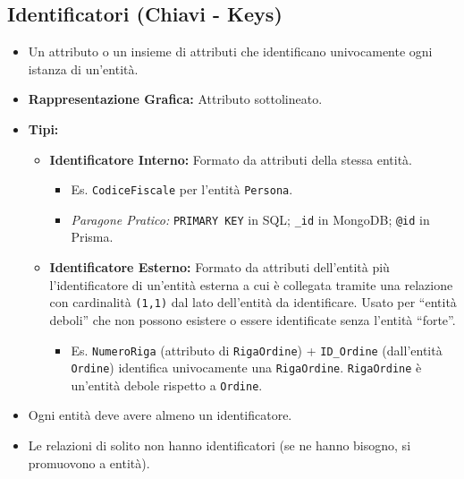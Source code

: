 \documentclass{article}
\begin{document}
	\subsection{Identificatori (Chiavi - Keys)}
	\begin{itemize}
		\item Un attributo o un insieme di attributi che identificano univocamente ogni istanza di un'entità.
		\item \textbf{Rappresentazione Grafica:} Attributo sottolineato.
		\item \textbf{Tipi:}
		\begin{itemize}
			\item \textbf{Identificatore Interno:} Formato da attributi della stessa entità.
			\begin{itemize}
				\item Es. \texttt{CodiceFiscale} per l'entità \texttt{Persona}.
				\item \textit{Paragone Pratico:} \texttt{PRIMARY KEY} in SQL; \texttt{\_id} in MongoDB; \texttt{@id} in Prisma.
			\end{itemize}
			\item \textbf{Identificatore Esterno:} Formato da attributi dell'entità più l'identificatore di un'entità esterna a cui è collegata tramite una relazione con cardinalità \texttt{(1,1)} dal lato dell'entità da identificare. Usato per ``entità deboli'' che non possono esistere o essere identificate senza l'entità ``forte''.
			\begin{itemize}
				\item Es. \texttt{NumeroRiga} (attributo di \texttt{RigaOrdine}) + \texttt{ID\_Ordine} (dall'entità \texttt{Ordine}) identifica univocamente una \texttt{RigaOrdine}. \texttt{RigaOrdine} è un'entità debole rispetto a \texttt{Ordine}.
			\end{itemize}
		\end{itemize}
		\item Ogni entità deve avere almeno un identificatore.
		\item Le relazioni di solito non hanno identificatori (se ne hanno bisogno, si promuovono a entità).
	\end{itemize}
	
\end{document}
